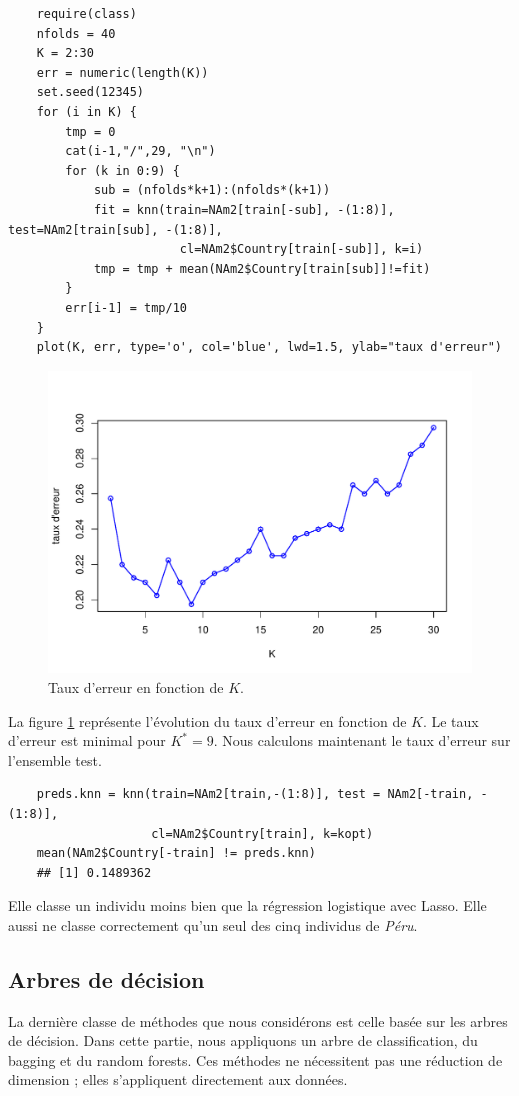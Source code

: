 \documentclass[12pt,a4paper]{article}
\begin{document}
\begin{lstlisting}
	require(class)
	nfolds = 40
	K = 2:30
	err = numeric(length(K))
	set.seed(12345)
	for (i in K) {
		tmp = 0
		cat(i-1,"/",29, "\n")
		for (k in 0:9) {
			sub = (nfolds*k+1):(nfolds*(k+1))
			fit = knn(train=NAm2[train[-sub], -(1:8)], test=NAm2[train[sub], -(1:8)],
						cl=NAm2$Country[train[-sub]], k=i)
			tmp = tmp + mean(NAm2$Country[train[sub]]!=fit)
		}
		err[i-1] = tmp/10
	}
	plot(K, err, type='o', col='blue', lwd=1.5, ylab="taux d'erreur")
\end{lstlisting}
\begin{figure}[h!]
	\begin{center}
		\includegraphics[scale=0.5]{figures/kopt.pdf}
		\caption{Taux d'erreur en fonction de $K$.}
		\label{fig:kopt}
	\end{center}
\end{figure}
La figure \ref{fig:kopt} représente l'évolution du taux d'erreur en fonction de $K$. Le taux d'erreur est minimal pour $K^* = 9$. Nous calculons maintenant le taux d'erreur sur l'ensemble test. \vspace{2mm}
\begin{lstlisting}
	preds.knn = knn(train=NAm2[train,-(1:8)], test = NAm2[-train, -(1:8)],
	                cl=NAm2$Country[train], k=kopt)
	mean(NAm2$Country[-train] != preds.knn)
	## [1] 0.1489362
\end{lstlisting}
Elle classe un individu moins bien que la régression logistique avec Lasso. Elle aussi ne classe correctement qu'un seul des cinq individus de \textit{Péru}.
\subsection{Arbres de décision}
La dernière classe de méthodes que nous considérons est celle basée sur les arbres de décision. Dans cette partie, nous appliquons un arbre de classification, du bagging et du random forests. Ces méthodes ne nécessitent pas une réduction de dimension ; elles s'appliquent directement aux données.
\end{document}
